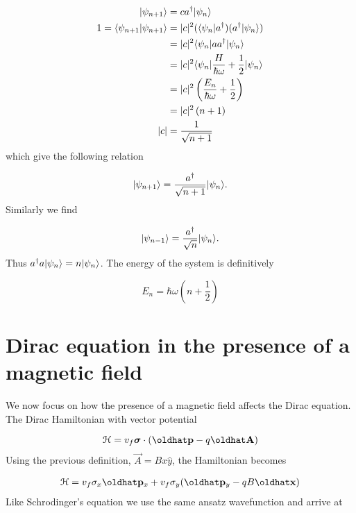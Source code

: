 \begin{align*}
  |\psi_{n+1}\rangle &= ca^{\dagger}|\psi_n\rangle \nonumber \\
  1 = \langle \psi_{n+1} | \psi_{n+1} \rangle &= |c|^2 (\langle \psi_n|a^{\dagger})(a^{\dagger}|\psi_n\rangle) \nonumber \\
  &= |c|^2 \langle \psi_n | aa^{\dagger} | \psi_n \rangle \nonumber \\
  &= |c|^2 \langle \psi_n | \dfrac{H}{\hbar\omega} + \dfrac{1}{2} |\psi_n \rangle \nonumber \\
  &= |c|^2 \left(\dfrac{E_n}{\hbar\omega} +\dfrac{1}{2} \right) \nonumber \\
  &= |c|^2 \left(n+1\right) \nonumber \\
  |c| &= \dfrac{1}{\sqrt{n+1}}
\end{align*}
which give the following relation

\begin{equation}
  |\psi_{n+1} \rangle = \dfrac{a^{\dagger}}{\sqrt{n+1}} |\psi_n \rangle.
\end{equation}
Similarly we find

\begin{equation}
  |\psi_{n-1} \rangle = \dfrac{a^{\dagger}}{\sqrt{n}} |\psi_n \rangle.
\end{equation}
Thus $a^{\dagger} a |\psi_n \rangle = n |\psi_n \rangle$.
The energy of the system is definitively

\begin{equation}
  E_n = \hbar\omega \left(n + \dfrac{1}{2} \right)
\end{equation}

\section{Dirac equation in the presence of a magnetic field}
\label{appendix:dirac}
We now focus on how the presence of a magnetic field affects the Dirac equation.
The Dirac Hamiltonian with vector potential

\begin{equation}
  \ham = v_f \bm{\sigma}\cdot(\op{p} - q\op{A})
\end{equation}
Using the previous definition, $\vec{A} = Bx\hat{y}$, the Hamiltonian becomes

\begin{align}
  \ham = v_f \sigma_x \op{p}_x + v_f \sigma_y (\op{p}_y - qB\op{x})
\end{align}
Like Schrodinger's equation we use the same ansatz wavefunction and arrive at

